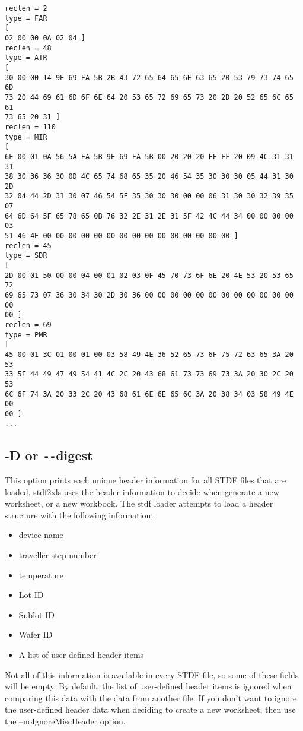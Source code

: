 \documentclass[letterpaper]{article}
\begin{document}
\begin{verbatim}
reclen = 2
type = FAR
[
02 00 00 0A 02 04 ]
reclen = 48
type = ATR
[
30 00 00 14 9E 69 FA 5B 2B 43 72 65 64 65 6E 63 65 20 53 79 73 74 65 6D
73 20 44 69 61 6D 6F 6E 64 20 53 65 72 69 65 73 20 2D 20 52 65 6C 65 61
73 65 20 31 ]
reclen = 110
type = MIR
[
6E 00 01 0A 56 5A FA 5B 9E 69 FA 5B 00 20 20 20 FF FF 20 09 4C 31 31 31
38 30 36 36 30 0D 4C 65 74 68 65 35 20 46 54 35 30 30 30 05 44 31 30 2D
32 04 44 2D 31 30 07 46 54 5F 35 30 30 30 00 00 06 31 30 30 32 39 35 07
64 6D 64 5F 65 78 65 0B 76 32 2E 31 2E 31 5F 42 4C 44 34 00 00 00 00 03
51 46 4E 00 00 00 00 00 00 00 00 00 00 00 00 00 00 00 ]
reclen = 45
type = SDR
[
2D 00 01 50 00 00 04 00 01 02 03 0F 45 70 73 6F 6E 20 4E 53 20 53 65 72
69 65 73 07 36 30 34 30 2D 30 36 00 00 00 00 00 00 00 00 00 00 00 00 00
00 ]
reclen = 69
type = PMR
[
45 00 01 3C 01 00 01 00 03 58 49 4E 36 52 65 73 6F 75 72 63 65 3A 20 53
33 5F 44 49 47 49 54 41 4C 2C 20 43 68 61 73 73 69 73 3A 20 30 2C 20 53
6C 6F 74 3A 20 33 2C 20 43 68 61 6E 6E 65 6C 3A 20 38 34 03 58 49 4E 00
00 ]
...
\end{verbatim}

\subsection{\bf -D or \texttt{-{}-}digest}
This option prints each unique header information for all STDF files that are loaded.
stdf2xls uses the header information to decide when generate a new worksheet, or a new
workbook.  The stdf loader attempts to load a header structure with the following
information:
\begin{itemize}
\item device name
\item traveller step number
\item temperature
\item Lot ID
\item Sublot ID
\item Wafer ID
\item A list of user-defined header items
\end{itemize}
Not all of this information is available in every STDF file, so some of these
fields will be empty.  By default, the list of user-defined header items
is ignored when comparing this data with the data from another file.
If you don't want to ignore the user-defined header data when deciding to
create a new worksheet, then use the --noIgnoreMiscHeader option.
\end{document}
